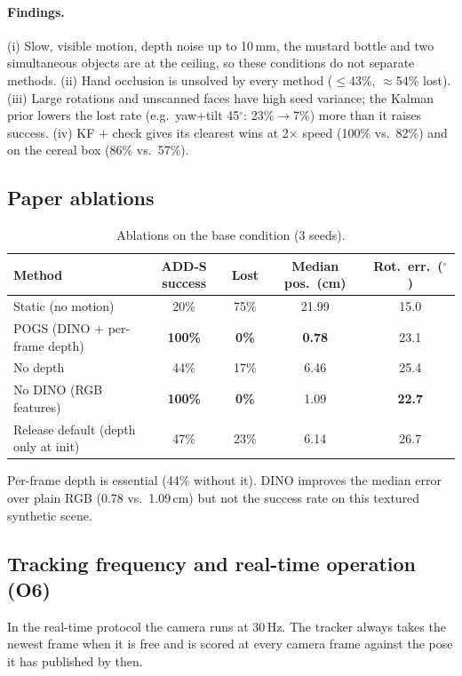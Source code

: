 \documentclass[10pt,a4paper]{article}
\newcommand{\best}[1]{\textbf{#1}}
\begin{document}
\paragraph{Findings.}
(i) Slow, visible motion, depth noise up to 10\,mm, the mustard bottle and two simultaneous objects
are at the ceiling, so these conditions do not separate methods.
(ii) Hand occlusion is unsolved by every method ($\le$43\%, $\approx$54\% lost).
(iii) Large rotations and unscanned faces have high seed variance; the Kalman prior lowers the lost
rate (e.g.\ yaw+tilt 45$^\circ$: 23\%$\to$7\%) more than it raises success.
(iv) KF + check gives its clearest wins at 2$\times$ speed (100\% vs.\ 82\%) and on the cereal box
(86\% vs.\ 57\%).

\subsection{Paper ablations}
\begin{table}[H]
\centering\small
\caption{Ablations on the base condition (3 seeds).}
\label{tab:ablation}
\begin{tabular}{@{}lcccc@{}}
\toprule
Method & ADD-S success & Lost & Median pos.\ (cm) & Rot.\ err.\ ($^\circ$) \\
\midrule
Static (no motion) & 20\% & 75\% & 21.99 & 15.0 \\
POGS (DINO + per-frame depth) & \best{100\%} & \best{0\%} & \best{0.78} & 23.1 \\
No depth & 44\% & 17\% & 6.46 & 25.4 \\
No DINO (RGB features) & \best{100\%} & \best{0\%} & 1.09 & \best{22.7} \\
Release default (depth only at init) & 47\% & 23\% & 6.14 & 26.7 \\
\bottomrule
\end{tabular}
\end{table}
Per-frame depth is essential (44\% without it). DINO improves the median error over plain RGB
(0.78 vs.\ 1.09\,cm) but not the success rate on this textured synthetic scene.

\subsection{Tracking frequency and real-time operation (O6)}
In the real-time protocol the camera runs at 30\,Hz. The tracker always takes the newest frame
when it is free and is scored at every camera frame against the pose it has published by then.
\end{document}
